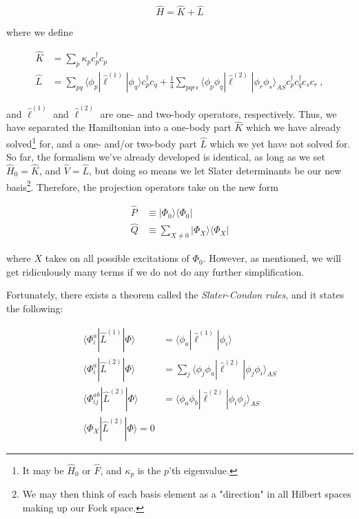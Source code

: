 \documentclass[10pt]{report}
\begin{document}
	\begin{equation}
		\hat{H} = \hat{K} + \hat{L}
	\end{equation}
	
	where we define
	
	\begin{align}
		\hat{K} &= \sum_p \kappa_p c_p^\dagger c_p\\
		\hat{L} &=  \sum_{pq} \langle\phi_p|\hat{\ell}^{(1)}|\phi_q\rangle c_p^\dagger c_q + \frac{1}{4}\sum_{pqrs} \langle\phi_p\phi_q|\hat{\ell}^{(2)}|\phi_r\phi_s\rangle_{AS} c_p^\dagger c_q^\dagger c_s c_r\:,
	\end{align}
	
	and $\hat{\ell}^{(1)}$ and $\hat{\ell}^{(2)}$ are one- and two-body operators, respectively. Thus, we have separated the Hamiltonian into a one-body part $\hat{K}$ which we have already solved\footnote{It may be $\hat{H}_0$ or $\hat{F}$, and $\kappa_p$ is the $p$'th eigenvalue.} for, and a one- and/or two-body part $\hat{L}$ which we yet have not solved for.\\
	
	So far, the formalism we've already developed is identical, as long as we set $\hat{H}_0=\hat{K}$, and $\hat{V}=\hat{L}$, but doing so means we let Slater determinants be our new basis\footnote{We may then think of each basis element as a "direction" in all Hilbert spaces making up our Fock space.}. Therefore, the projection operators take on the new form
	
	\begin{align}
		\hat{P} &\equiv |\Phi_0\rangle\langle\Phi_0| \\
		\hat{Q} &\equiv \sum_{X\neq0} |\Phi_X\rangle\langle\Phi_X|
	\end{align}
	
	where $X$ takes on all possible excitations of $\Phi_0$.
	However, as mentioned, we will get ridiculously many terms if we do not do any further simplification.
	
	Fortunately, there exists a theorem called the \emph{Slater-Condon rules}, and it states the following:
	
	\begin{align}
		\langle\Phi_i^a|\hat{L}^{(1)}|\Phi\rangle &= \langle\phi_a|\hat{\ell}^{(1)}|\phi_i\rangle \\
		\langle\Phi_i^a|\hat{L}^{(2)}|\Phi\rangle &= \sum_{j}\langle\phi_j\phi_a|\hat{\ell}^{(2)}|\phi_j\phi_i\rangle_{AS} \\
		\langle\Phi_{ij}^{ab}|\hat{L}^{(2)}|\Phi\rangle &= \langle\phi_a\phi_b|\hat{\ell}^{(2)}|\phi_i\phi_j\rangle_{AS} \\
		\langle\Phi_X|\hat{L}^{(2)}|\Phi\rangle = 0
	\end{align}
	
\end{document}
